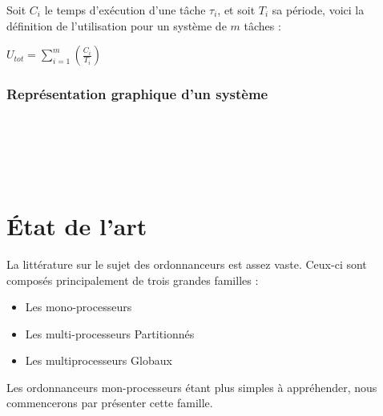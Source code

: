\documentclass[11pt,a4paper,oneside]{report}
\begin{document}
Soit $C_i$ le temps d'exécution d'une tâche $\tau_i$, et soit $T_i$ sa période, voici la définition de 
l'utilisation pour un système de $m$ tâches :\\
\begin{center}
	$U_{tot} = \sum_{i = 1}^{m}(\frac{C_i}{T_i})$
\end{center}


\subsection{Représentation graphique d'un système}
\begin{ganttchart}{1}{15}
	\\
	\\
	\\
	\\
\end{ganttchart}



%
%
\chapter{État de l'art}
\newtheorem{defi}{Déf.}

La littérature sur le sujet des ordonnanceurs est assez vaste. 
Ceux-ci sont composés principalement de trois grandes familles :\\
\begin{itemize}
	\item Les mono-processeurs
	\item Les multi-processeurs Partitionnés
	\item Les multiprocesseurs Globaux
\end{itemize}
Les ordonnanceurs mon-processeurs étant plus simples à appréhender, nous commencerons 
par présenter cette famille.
\end{document}
